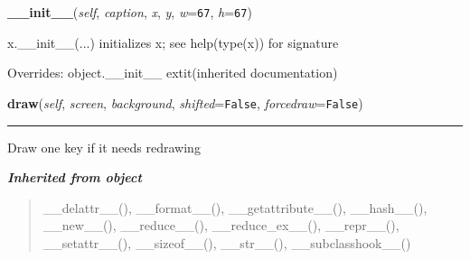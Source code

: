    \vspace{0.5ex}

\hspace{.8\funcindent}\begin{boxedminipage}{\funcwidth}

    \raggedright \textbf{\_\_init\_\_}(\textit{self}, \textit{caption}, \textit{x}, \textit{y}, \textit{w}={\tt 67}, \textit{h}={\tt 67})

\setlength{\parskip}{2ex}
    x.\_\_init\_\_(...) initializes x; see help(type(x)) for signature

\setlength{\parskip}{1ex}
      Overrides: object.\_\_init\_\_ 	extit{(inherited documentation)}

    \end{boxedminipage}

    \label{pygame-asteroids:virtual_keyboard:VirtualKey:draw}

    \vspace{0.5ex}

\hspace{.8\funcindent}\begin{boxedminipage}{\funcwidth}

    \raggedright \textbf{draw}(\textit{self}, \textit{screen}, \textit{background}, \textit{shifted}={\tt False}, \textit{forcedraw}={\tt False})

    \vspace{-1.5ex}

    \rule{\textwidth}{0.5\fboxrule}
\setlength{\parskip}{2ex}
    Draw one key if it needs redrawing

\setlength{\parskip}{1ex}
    \end{boxedminipage}


\large{\textbf{\textit{Inherited from object}}}

\begin{quote}
\_\_delattr\_\_(), \_\_format\_\_(), \_\_getattribute\_\_(), \_\_hash\_\_(), \_\_new\_\_(), \_\_reduce\_\_(), \_\_reduce\_ex\_\_(), \_\_repr\_\_(), \_\_setattr\_\_(), \_\_sizeof\_\_(), \_\_str\_\_(), \_\_subclasshook\_\_()
\end{quote}


